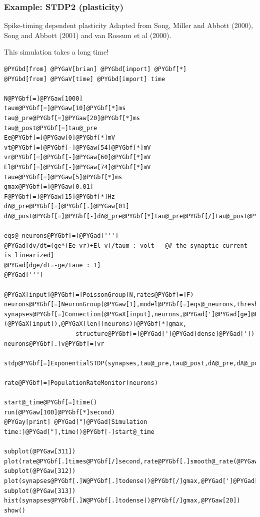 \documentclass[letterpaper,10pt,english]{manual}
\begin{document}
\resetcurrentobjects
\hypertarget{--doc-examples-plasticity_STDP2}{}

\hypertarget{index-98}{}\subsubsection{Example: STDP2 (plasticity)}

Spike-timing dependent plasticity
Adapted from Song, Miller and Abbott (2000), Song and Abbott (2001)
and van Rossum et al (2000).

This simulation takes a long time!

\begin{Verbatim}[commandchars=@\[\]]
@PYGbd[from] @PYGaV[brian] @PYGbd[import] @PYGbf[*]
@PYGbd[from] @PYGaV[time] @PYGbd[import] time

N@PYGbf[=]@PYGaw[1000]
taum@PYGbf[=]@PYGaw[10]@PYGbf[*]ms
tau@_pre@PYGbf[=]@PYGaw[20]@PYGbf[*]ms
tau@_post@PYGbf[=]tau@_pre
Ee@PYGbf[=]@PYGaw[0]@PYGbf[*]mV
vt@PYGbf[=]@PYGbf[-]@PYGaw[54]@PYGbf[*]mV
vr@PYGbf[=]@PYGbf[-]@PYGaw[60]@PYGbf[*]mV
El@PYGbf[=]@PYGbf[-]@PYGaw[74]@PYGbf[*]mV
taue@PYGbf[=]@PYGaw[5]@PYGbf[*]ms
gmax@PYGbf[=]@PYGaw[0.01]
F@PYGbf[=]@PYGaw[15]@PYGbf[*]Hz
dA@_pre@PYGbf[=]@PYGbf[.]@PYGaw[01]
dA@_post@PYGbf[=]@PYGbf[-]dA@_pre@PYGbf[*]tau@_pre@PYGbf[/]tau@_post@PYGbf[*]@PYGaw[2.5]

eqs@_neurons@PYGbf[=]@PYGad[''']
@PYGad[dv/dt=(ge*(Ee-vr)+El-v)/taum : volt   @# the synaptic current is linearized]
@PYGad[dge/dt=-ge/taue : 1]
@PYGad[''']

@PYGaX[input]@PYGbf[=]PoissonGroup(N,rates@PYGbf[=]F)
neurons@PYGbf[=]NeuronGroup(@PYGaw[1],model@PYGbf[=]eqs@_neurons,threshold@PYGbf[=]vt,reset@PYGbf[=]vr)
synapses@PYGbf[=]Connection(@PYGaX[input],neurons,@PYGad[']@PYGad[ge]@PYGad['],weight@PYGbf[=]rand(@PYGaX[len](@PYGaX[input]),@PYGaX[len](neurons))@PYGbf[*]gmax,
                    structure@PYGbf[=]@PYGad[']@PYGad[dense]@PYGad['])
neurons@PYGbf[.]v@PYGbf[=]vr

stdp@PYGbf[=]ExponentialSTDP(synapses,tau@_pre,tau@_post,dA@_pre,dA@_post,wmax@PYGbf[=]gmax,update@PYGbf[=]@PYGad[']@PYGad[mixed]@PYGad['])

rate@PYGbf[=]PopulationRateMonitor(neurons)

start@_time@PYGbf[=]time()
run(@PYGaw[100]@PYGbf[*]second)
@PYGay[print] @PYGad["]@PYGad[Simulation time:]@PYGad["],time()@PYGbf[-]start@_time

subplot(@PYGaw[311])
plot(rate@PYGbf[.]times@PYGbf[/]second,rate@PYGbf[.]smooth@_rate(@PYGaw[100]@PYGbf[*]ms))
subplot(@PYGaw[312])
plot(synapses@PYGbf[.]W@PYGbf[.]todense()@PYGbf[/]gmax,@PYGad[']@PYGad[.]@PYGad['])
subplot(@PYGaw[313])
hist(synapses@PYGbf[.]W@PYGbf[.]todense()@PYGbf[/]gmax,@PYGaw[20])
show()
\end{Verbatim}
\end{document}
